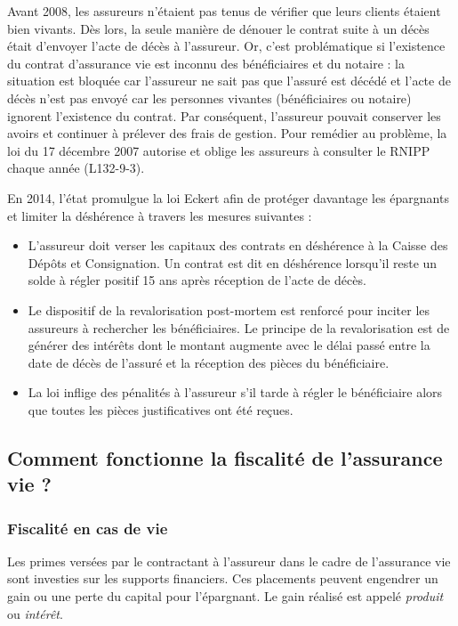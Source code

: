 \documentclass{article}
\newcommand{\blackFrame}[2]{
    \begin{tcolorbox}[colback=white,colframe=black!100!white,title={#1}]
        #2
    \end{tcolorbox}
}
\begin{document}
\blackFrame{Zoom historique sur la lutte contre la déshérence des capitaux par l'État}{
Avant 2008, les assureurs n'étaient pas tenus de vérifier que leurs clients étaient bien vivants. Dès lors, la seule manière de dénouer le contrat suite à un décès était d'envoyer l'acte de décès à l'assureur. Or, c'est problématique si l'existence du contrat d'assurance vie est inconnu des bénéficiaires et du notaire : la situation est bloquée car l'assureur ne sait pas que l'assuré est décédé et l'acte de décès n'est pas envoyé car les personnes vivantes (bénéficiaires ou notaire) ignorent l'existence du contrat. Par conséquent, l'assureur pouvait conserver les avoirs et continuer à prélever des frais de gestion. Pour remédier au problème, la loi du 17 décembre 2007 autorise et oblige les assureurs à consulter le RNIPP chaque année (L132-9-3).

En 2014, l'état promulgue la loi Eckert afin de protéger davantage les épargnants et limiter la déshérence à travers les mesures suivantes :

\begin{itemize}
    \item L'assureur doit verser les capitaux des contrats en déshérence à la Caisse des Dépôts et Consignation. Un contrat est dit en déshérence lorsqu'il reste un solde à régler positif 15 ans après réception de l'acte de décès.
    \item Le dispositif de la revalorisation post-mortem est renforcé pour inciter les assureurs à rechercher les bénéficiaires. Le principe de la revalorisation est de générer des intérêts dont le montant augmente avec le délai passé entre la date de décès de l'assuré et la réception des pièces du bénéficiaire.
    \item La loi inflige des pénalités à l'assureur s'il tarde à régler le bénéficiaire alors que toutes les pièces justificatives ont été reçues.
\end{itemize}
}

\subsection{Comment fonctionne la fiscalité de l'assurance vie ?}
\subsubsection{Fiscalité en cas de vie}
Les primes versées par le contractant à l'assureur dans le cadre de l'assurance vie sont investies sur les supports financiers.  Ces placements peuvent engendrer un gain ou une perte du capital pour l'épargnant. Le gain réalisé est appelé \textit{produit} ou \textit{intérêt}.
\end{document}
